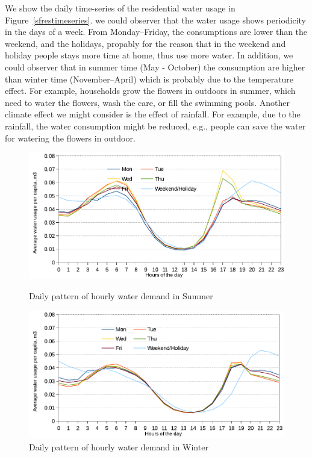 \documentclass{sig-alternate}
\newcommand{\eg}{e.g.}
\begin{document}
We show the daily time-series of the residential water usage in Figure~\ref{sfrestimeseries}. we could observer that the water usage shows periodicity in the days of a week. From Monday--Friday, the consumptions are lower than the weekend, and the holidays, propably for the reason that in the weekend and holiday people stays more time at home, thus use more water. In addition, we could observer that in summer time (May - October) the consumption are higher than winter time (November--April) which is probably due to the temperature effect. For example,  households grow the flowers in outdoors in summer, which need to water the flowers,  wash the care, or fill the swimming pools. Another climate effect we might consider is the effect of rainfall. For example, due to the rainfall, the water consumption might be reduced, \eg, people can save the water for watering the flowers in outdoor.




\begin{figure}[htp]
\centering
\begin{minipage}[b]{0.4\linewidth}
\includegraphics[width=1.0\textwidth]{images/avgwaterusagesummer}
\vspace{-15pt}
\caption{Daily pattern of hourly water demand in Summer}
\label{fig:avgwaterusagesummer}
\end{minipage}
\hspace{5pt}
\begin{minipage}[b]{0.4\linewidth}
\includegraphics[width=1.0\textwidth]{images/avgwaterusagewinter}
\vspace{-15pt}
\caption{Daily pattern of hourly water demand in Winter}
\label{fig:avgwaterusagewinter}
\end{minipage}
\end{figure}
\end{document}
